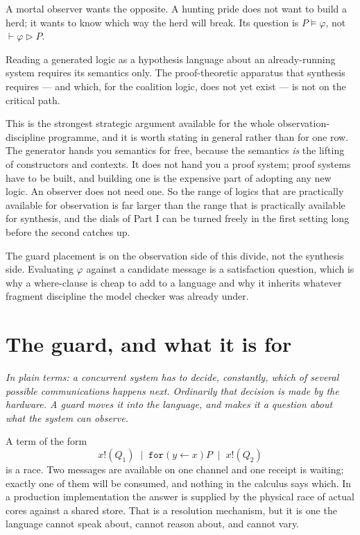A mortal observer wants the opposite. A hunting pride does not want to build a
herd; it wants to know which way the herd will break. Its question is
$P \models \varphi$, not $\vdash \varphi \triangleright P$.

\begin{proposition}
\label{prop:sidestep}
Reading a generated logic as a hypothesis language about an already-running system
requires its semantics only. The proof-theoretic apparatus that synthesis requires
--- and which, for the coalition logic, does not yet exist --- is not on the
critical path.
\end{proposition}

This is the strongest strategic argument available for the whole
observation-discipline programme, and it is worth stating in general rather than
for one row. The generator hands you semantics for free, because the semantics
\emph{is} the lifting of constructors and contexts. It does not hand you a proof
system; proof systems have to be built, and building one is the expensive part of
adopting any new logic. An observer does not need one. So the range of logics that
are practically available for observation is far larger than the range that is
practically available for synthesis, and the dials of Part I can be turned freely
in the first setting long before the second catches up.

\begin{remark}
The guard placement is on the observation side of this divide, not the synthesis
side. Evaluating $\varphi$ against a candidate message is a satisfaction question,
which is why a where-clause is cheap to add to a language and why it inherits
whatever fragment discipline the model checker was already under.
\end{remark}

\section{The guard, and what it is for}
\label{sec:guard}

\noindent\emph{In plain terms: a concurrent system has to decide, constantly,
which of several possible communications happens next. Ordinarily that decision is
made by the hardware. A guard moves it into the language, and makes it a question
about what the system can observe.}

A term of the form
\[
  x!(Q_{1}) \;\mid\; \texttt{for}(y \leftarrow x)P \;\mid\; x!(Q_{2})
\]
is a race. Two messages are available on one channel and one receipt is waiting;
exactly one of them will be consumed, and nothing in the calculus says which. In a
production implementation the answer is supplied by the physical race of actual
cores against a shared store. That is a resolution mechanism, but it is one the
language cannot speak about, cannot reason about, and cannot vary.

